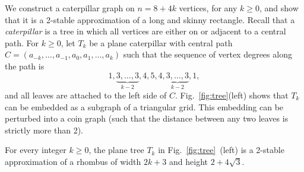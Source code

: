 \documentclass[runningheads]{article}
\begin{document}

We construct a caterpillar graph on $n=8+4k$ vertices, for any $k \geq 0$,
and show that it is a 2-stable approximation of a long and skinny rectangle.
Recall that a \emph{caterpillar} is a tree in which all vertices are either on
or adjacent to a central path. For $k\geq 0$, let $T_k$ be a plane caterpillar
with central path $C=(a_{-k},\ldots, a_{-1},a_0,a_1,\ldots ,a_k)$ such that the
sequence of vertex degrees along the path is
\begin{equation}
1, \underbrace{3, \ldots, 3}_{k-2}, 4, 5, 4,
\underbrace{3, \ldots, 3}_{k-2}, 1 ,
\label{eq:caterpillarDegrees}
\end{equation}
and all leaves are attached to the left side of $C$.
Fig.~\ref{fig:tree}(left) shows that $T_k$ can be embedded as a subgraph
of a triangular grid. This embedding can be perturbed into a coin graph
(such that the distance between any two leaves is strictly more than 2).


\begin{lemma}\label{lem:stableTree}
For every integer $k\geq 0$, the plane tree $T_k$ in Fig.~\ref{fig:tree}~(left)
is a 2-stable approximation of a rhombus of width $2k+3$ and height $2+4\sqrt{3}$.
\end{lemma}
\end{document}

